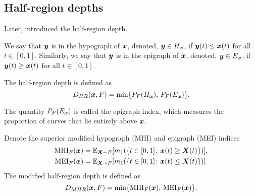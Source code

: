 \subsection{Half-region depths}

Later, \textcite{pintado-romo-2011} introduced the half-region depth.

\begin{definition}
    We say that $\bm{y}$ is in the hypograph of $\bm{x}$, denoted, $\bm{y} \in
    H_{\bm{x}}$, if $\bm{y}(t) \leq \bm{x}(t)$ for all $t \in [0, 1]$.
    Similarly, we say that $\bm{y}$ is in the epigraph of $\bm{x}$, denoted, $\bm{y}
    \in E_{\bm{x}}$, if $\bm{y}(t) \geq \bm{x}(t)$ for all $t \in [0, 1]$.
\end{definition}

\begin{definition}
    The half-region depth is defined as
    \begin{equation}
        D_{HR}(\bm{x}, F) = \min\{P_F(H_{\bm{x}}),\, P_F(E_{\bm{x}})\}.
    \end{equation}
\end{definition}

The quantity $P_F(E_{\bm{x}})$ is called the epigraph index, which measures the
proportion of curves that lie entirely above $\bm{x}$.

\begin{definition}
    Denote the superior modified hypograph (MHI) and epigraph (MEI) indices
    \begin{align}
        \operatorname{MHI}_F(\bm{x}) &= \operatorname{\mathbb{E}}_{\bm{X} \sim F}[m_1(\{t \in [0, 1]\colon \bm{x}(t) \geq \bm{X}(t)\})], \\
        \operatorname{MEI}_F(\bm{x}) &= \operatorname{\mathbb{E}}_{\bm{X} \sim F}[m_1(\{t \in [0, 1]\colon \bm{x}(t) \leq \bm{X}(t)\})].
    \end{align}
    The modified half-region depth is defined as
    \begin{equation}
        D_{MHR}(\bm{x}, F) = \min\{\operatorname{MHI}_F(\bm{x}),\, \operatorname{MEI}_F(\bm{x})\}.
    \end{equation}
\end{definition}

